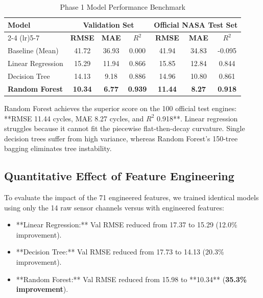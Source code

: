 \documentclass[conference]{IEEEtran}
\begin{document}
\begin{table}[htbp]
\caption{Phase 1 Model Performance Benchmark}
\label{tab:phase1_results}
\centering
\begin{tabular}{lcccccc}
\toprule
\multirow{2}{*}{\textbf{Model}} & \multicolumn{3}{c}{\textbf{Validation Set}} & \multicolumn{3}{c}{\textbf{Official NASA Test Set}} \\
\cmidrule(lr){2-4} \cmidrule(lr){5-7}
& \textbf{RMSE} & \textbf{MAE} & \textbf{$R^2$} & \textbf{RMSE} & \textbf{MAE} & \textbf{$R^2$} \\
\midrule
Baseline (Mean) & 41.72 & 36.93 & 0.000 & 41.94 & 34.83 & -0.095 \\
Linear Regression & 15.29 & 11.94 & 0.866 & 15.85 & 12.84 & 0.844 \\
Decision Tree & 14.13 & 9.18 & 0.886 & 14.96 & 10.80 & 0.861 \\
\textbf{Random Forest} & \textbf{10.34} & \textbf{6.77} & \textbf{0.939} & \textbf{11.44} & \textbf{8.27} & \textbf{0.918} \\
\bottomrule
\end{tabular}
\end{table}

Random Forest achieves the superior score on the 100 official test engines: **RMSE 11.44 cycles, MAE 8.27 cycles, and $R^2$ 0.918**. Linear regression struggles because it cannot fit the piecewise flat-then-decay curvature. Single decision trees suffer from high variance, whereas Random Forest's 150-tree bagging eliminates tree instability.

\subsection{Quantitative Effect of Feature Engineering}
To evaluate the impact of the 71 engineered features, we trained identical models using only the 14 raw sensor channels versus with engineered features:
\begin{itemize}
    \item **Linear Regression:** Val RMSE reduced from 17.37 to 15.29 (12.0\% improvement).
    \item **Decision Tree:** Val RMSE reduced from 17.73 to 14.13 (20.3\% improvement).
    \item **Random Forest:** Val RMSE reduced from 15.98 to **10.34** (\textbf{35.3\% improvement}).
\end{itemize}
\end{document}
